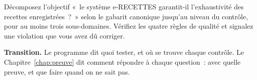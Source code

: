 \begin{boxexo}[title={\ding{45}\quad Exercice~6.4. Décomposer e-RECETTES \niveauexpert}]
Décomposez l'objectif «~le système e-RECETTES garantit-il l'exhaustivité
des recettes enregistrées~?~» selon le gabarit canonique jusqu'au niveau
du contrôle, pour au moins trois sous-domaines. Vérifiez les quatre règles
de qualité et signalez une violation que vous avez dû corriger.
\end{boxexo}

\begin{boxinfo}
\textbf{Transition.} Le programme dit quoi tester, et où se trouve chaque
contrôle. Le Chapitre~\ref{chap:preuve} dit comment répondre à chaque
question~: avec quelle preuve, et que faire quand on ne sait pas.
\end{boxinfo}
